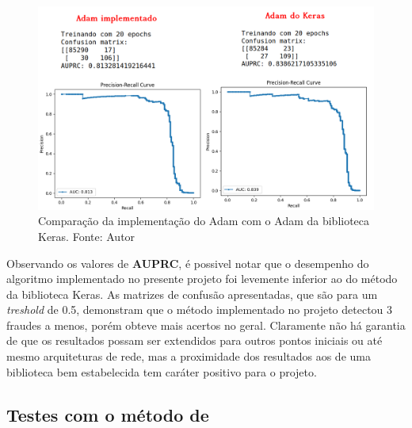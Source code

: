 \documentclass[11pt]{article}
\begin{document}
\begin{figure}[H]
\center
\includegraphics[scale=0.5]{Figuras/ADAM_VS_KERAS.png}
\caption{Comparação da implementação do Adam com o Adam da biblioteca Keras. Fonte: Autor} 
\label{AVK}
\end{figure}


\noindent
Observando os valores de \textbf{AUPRC}, é possivel notar que o desempenho do algoritmo implementado no presente projeto foi levemente inferior ao do método da biblioteca Keras. As matrizes de confusão apresentadas, que são para um \textit{treshold} de 0.5, demonstram que o método implementado no projeto detectou 3 fraudes a menos, porém obteve mais acertos no geral. Claramente não há garantia de que os resultados possam ser extendidos para outros pontos iniciais ou até mesmo arquiteturas de rede, mas a proximidade dos resultados aos de uma biblioteca bem estabelecida tem caráter positivo para o projeto.



\subsection*{Testes com o método de \cite{bmLS}}
\end{document}
